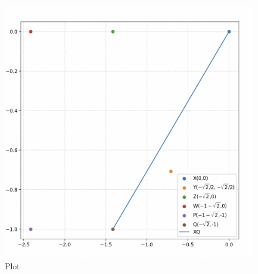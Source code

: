 \documentclass[12pt]{article}
\begin{document}
\begin{figure}[H]
    \centering
    \includegraphics[width=0.8\columnwidth]{Figs/1218.png}
    \caption{Plot}
    \label{fig:placeholder}
\end{figure}
\end{document}

